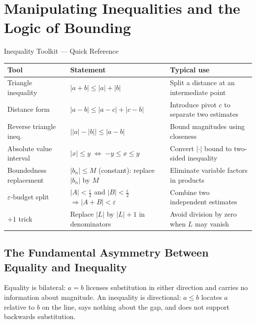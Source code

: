 
\section{Manipulating Inequalities and the Logic of Bounding}
\label{sec:inequality-bounding}

\begin{toolkitbox}{Inequality Toolkit — Quick Reference}
\small
\begin{tabular}{l l l}
\toprule
\textbf{Tool} & \textbf{Statement} & \textbf{Typical use} \\
\midrule
Triangle inequality
  & $|a+b|\leq|a|+|b|$
  & Split a distance at an intermediate point \\[3pt]
Distance form
  & $|a-b|\leq|a-c|+|c-b|$
  & Introduce pivot $c$ to separate two estimates \\[3pt]
Reverse triangle ineq.
  & $\bigl\lvert|a|-|b|\bigr\rvert\leq|a-b|$
  & Bound magnitudes using closeness \\[3pt]
Absolute value interval
  & $|x|\leq y\;\Longleftrightarrow\;{-y}\leq x\leq y$
  & Convert $|\cdot|$ bound to two-sided inequality \\[3pt]
Boundedness replacement
  & $|b_n|\leq M$ (constant): replace $|b_n|$ by $M$
  & Eliminate variable factors in products \\[3pt]
$\varepsilon$-budget split
  & $|A|<\tfrac{\varepsilon}{2}$ and $|B|<\tfrac{\varepsilon}{2}$
    $\Rightarrow|A+B|<\varepsilon$
  & Combine two independent estimates \\[3pt]
$+1$ trick
  & Replace $|L|$ by $|L|+1$ in denominators
  & Avoid division by zero when $L$ may vanish \\
\bottomrule
\end{tabular}
\end{toolkitbox}

\subsection*{The Fundamental Asymmetry Between Equality and Inequality}
\label{subsec:ineq-asymmetry}

Equality is bilateral: $a=b$ licenses substitution in either direction and
carries no information about magnitude. An inequality is directional:
$a\leq b$ locates $a$ relative to $b$ on the line, says nothing about the
gap, and does not support backwards substitution.

